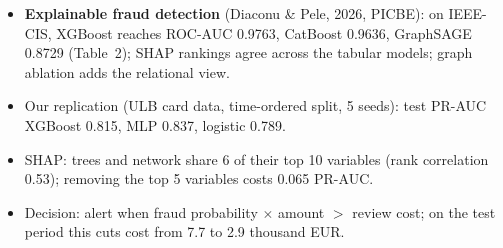 \begin{itemize}\setlength{\itemsep}{2pt}
  \item \textbf{Explainable fraud detection} (Diaconu \& Pele, 2026, PICBE): on IEEE-CIS, XGBoost reaches ROC-AUC 0.9763, CatBoost 0.9636, GraphSAGE 0.8729 (Table~2); SHAP rankings agree across the tabular models; graph ablation adds the relational view.
  \item Our replication (ULB card data, time-ordered split, 5 seeds): test PR-AUC XGBoost 0.815, MLP 0.837, logistic 0.789.
  \item SHAP: trees and network share 6 of their top 10 variables (rank correlation 0.53); removing the top 5 variables costs 0.065 PR-AUC.
  \item Decision: alert when fraud probability $\times$ amount $>$ review cost; on the test period this cuts cost from 7.7 to 2.9 thousand EUR.
\end{itemize}
